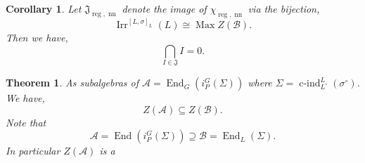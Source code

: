 \documentclass[8pt]{article}
\newtheorem{theorem}{Theorem} [section]
\newtheorem{corollary}{Corollary} [section]
\DeclareMathOperator{\cind}{c-ind}
\DeclareMathOperator{\End}{End}
\DeclareMathOperator{\Irr}{Irr}
\DeclareMathOperator{\nn}{nn}
\DeclareMathOperator{\reg}{reg}
\DeclareMathOperator{\Max}{Max}
\newcommand{\cA}{\mathcal{A}}
\newcommand{\cB}{\mathcal{B}}
\begin{document}
\begin{corollary}
  \label{corollary_112}
  Let $\mathfrak{J}_{\reg,\nn}$ denote the image of $\chi_{\reg,\nn}$ via the bijection,
  \begin{equation*}
    \Irr^{[L,\sigma]_L}(L)\cong\Max Z(\cB).
  \end{equation*}
  Then we have,
  \begin{equation*}
    \bigcap_{I\in\mathfrak{J}}I=0.
  \end{equation*}
\end{corollary}
\begin{theorem}
  \label{theorem_113}
  As subalgebras of $\cA=\End_G(i_P^G(\Sigma))$ where $\Sigma=\cind_{L^\circ}^L(\sigma^\circ)$. We have,
  \begin{equation*}
    Z(\cA)\subseteq Z(\cB).
  \end{equation*}
  Note that 
  \begin{equation*}
    \cA = \End(i_P^G(\Sigma))\supseteq\cB = \End_L(\Sigma).
  \end{equation*}
  In particular $Z(\cA)$ is a 
\end{theorem}
\end{document}
